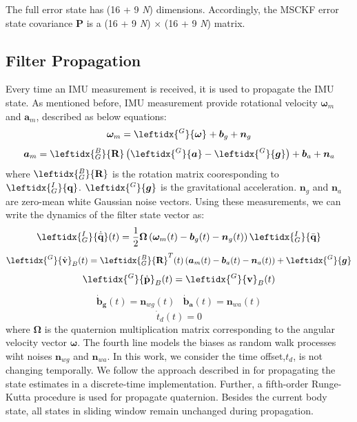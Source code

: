 \documentclass[a4paper, 10pt, conference]{ieeeconf}      %
\begin{document}
The full error state has  (16 + 9 \emph N) dimensions. Accordingly, the MSCKF error state covariance $ \bm{P} $ is a (16 + 9 \emph N) $ \times $ (16 + 9 \emph N) matrix. 



\subsection{Filter Propagation}

Every time an IMU measurement is received,
it is used to propagate the IMU state. As mentioned before, IMU measurement provide rotational velocity $ \bm {\omega}_m $ and $ \bm a_m $, described as below equations: 
\begin{equation}
\bm{\omega}_m ={\leftidx{^G}{ {\bm \omega}}_{}} + \bm b_g + \bm n_g
\end{equation}
\begin{equation}
\bm{a}_m =   \leftidx{_G^B}{{\textbf R}}  \left( \leftidx{^G}{\bm a} - \leftidx{^G}{\bm g}\right) + \bm b_a +\bm n_a
\end{equation}
where $ \leftidx{_G^B}{{\textbf R}} $ is the rotation matrix cooresponding to $  \leftidx{_G^I}{{\textbf q}} $. $\leftidx{^G}{\bm g}  $ is the gravitational acceleration.  $ \bm n_g $ and $ \bm n_a $  are zero-mean white Gaussian noise vectors. Using these measurements, we can
write the dynamics of the filter state vector as:
\begin{equation}
\leftidx{_G^I}{\dot {\bar{\textbf q}}}(t)=\frac{1}{2} \bm \Omega\left(  {\bm \omega}_m (t)-\bm b_g(t) - \bm n_g(t) \right)\leftidx{_G^I}{ {\bar{\textbf q}}} 
\end{equation}
\begin{equation}
{\leftidx{^G}{\dot {\textbf v}}_{B}}(t)=\leftidx{_G^B}{{\textbf R}}^T(t)\left( \bm a_m(t)-\bm b_a(t)-\bm n_a(t) \right)+  \leftidx{^G}{\bm g}
\end{equation}
\begin{equation}
{\leftidx{^G}{\dot {\textbf p}}_{B}}(t)= {\leftidx{^G}{ {\textbf v}}_{B}}(t)
\end{equation}
\begin{eqnarray}
{ \bm {\dot b_g}}(t) =  \bm n_{wg}(t) & { \bm {\dot b_a}}(t) =  \bm n_{wa}(t)
\end{eqnarray}
\begin{equation}
{{\dot {t}_d}}(t)= 0
\end{equation}
where $ \bm \Omega $ is the quaternion multiplication matrix corresponding to the angular velocity vector $ \bm \omega $. The fourth line models the biases  as random walk processes wiht noises $  \bm n_{wg} $ and $ \bm n_{wa} $. In this work, we consider the time offset,$ t_d $, is not changing temporally. We follow the approach described in \cite{li2013high} for propagating the state estimates in a discrete-time implementation. Further, a fifth-order
Runge-Kutta procedure is used for propagate quaternion.  Besides the current body state, all  states in sliding window   remain unchanged during propagation.
\end{document}
